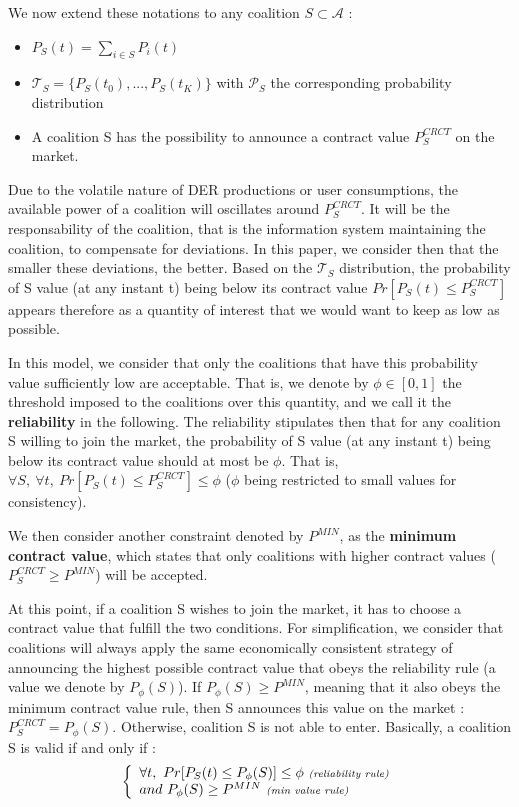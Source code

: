 \documentclass[conference]{IEEEtran}
\begin{document}
We now extend these notations to any coalition $ S \subset \mathcal{A} $ : 
\begin{itemize}
\item $ P_{S}(t) = \sum_{i \in S} P_{i}(t) $
\item $ \mathcal{T}_{S} = \{ P_{S}(t_{0}),...,P_{S}(t_{K}) \} $ with $ \mathcal{P}_{S} $ the corresponding probability distribution
\item A coalition S has the possibility to announce a contract value $ P_{S}^{CRCT} $ on the market.
\end{itemize}

Due to the volatile nature of DER productions or user consumptions, the available power of a coalition will oscillates around $ P_{S}^{CRCT} $. It will be the responsability of the coalition, that is the information system maintaining the coalition, to compensate for deviations. In this paper, we consider then that the smaller these deviations, the better. Based on the $ \mathcal{T}_{S} $ distribution, the probability of S value (at any instant t) being below its contract value $ Pr[P_{S}(t) \leq P_{S}^{CRCT} ] $ appears therefore as a quantity of interest that we would want to keep as low as possible. 

In this model, we consider that only the coalitions that have this probability value sufficiently low are acceptable. That is, we denote by $ \phi \in [0,1] $ the threshold imposed to the coalitions over this quantity, and we call it the \textbf{reliability} in the following. The reliability stipulates then that for any coalition S willing to join the market, the probability of S value (at any instant t) being below its contract value should at most be $ \phi $. That is, $ \forall S,\ \forall t,\ Pr[P_{S}(t) \leq P_{S}^{CRCT} ] \leq \phi $ ($ \phi $ being restricted to small values for consistency).

We then consider another constraint denoted by $ P^{MIN} $, as the \textbf{minimum contract value}, which states that only coalitions with higher contract values ($ P_{S}^{CRCT} \geq P^{MIN} $) will be accepted.

At this point, if a coalition S wishes to join the market, it has to choose a contract value that fulfill the two conditions. For simplification, we consider that coalitions will always apply the same economically consistent strategy of announcing the highest possible contract value that obeys the reliability rule (a value we denote by $ P_{\phi}(S) $). If $ P_{\phi}(S) \geq P^{MIN} $, meaning that it also obeys the minimum contract value rule, then S announces this value on the market : $ P_{S}^{CRCT} = P_{\phi}(S) $. Otherwise, coalition S is not able to enter.
Basically, a coalition S is valid if and only if :
\begin{equation}
\left\{ \begin{array}{lll}
		\forall t,\ Pr[ P_{S}(t) \leq P_{\phi}(S)] \leq \phi\ \textit{{\scriptsize (reliability rule)}} \\
		and\ P_{\phi}(S) \geq P^{MIN}\ \textit{{\scriptsize (min value rule)}}

\end{array} \right. 
\label{rules}
\end{equation}
\end{document}

